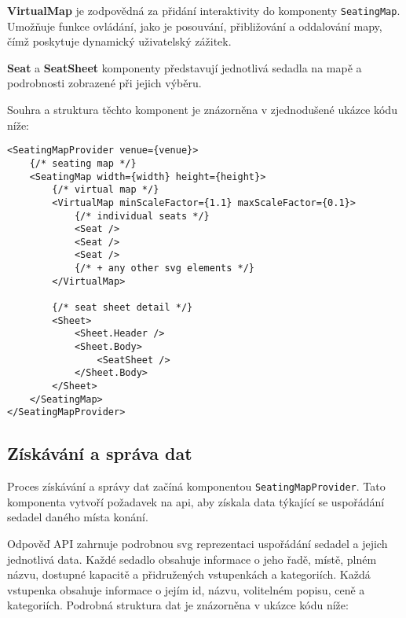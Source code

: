 \textbf{VirtualMap} je zodpovědná za přidání interaktivity do komponenty \texttt{SeatingMap}.
Umožňuje funkce ovládání, jako je posouvání, přibližování a oddalování mapy, čímž poskytuje dynamický uživatelský zážitek.

\textbf{Seat} a \textbf{SeatSheet} komponenty představují jednotlivá sedadla na mapě a podrobnosti zobrazené při jejich výběru.

Souhra a struktura těchto komponent je znázorněna v zjednodušené ukázce kódu níže:

\begin{verbatim}
<SeatingMapProvider venue={venue}>
	{/* seating map */}
	<SeatingMap width={width} height={height}>
		{/* virtual map */}
		<VirtualMap minScaleFactor={1.1} maxScaleFactor={0.1}>
			{/* individual seats */}
			<Seat />
			<Seat />
			<Seat />
			{/* + any other svg elements */}
		</VirtualMap>

		{/* seat sheet detail */}
		<Sheet>
			<Sheet.Header />
			<Sheet.Body>
				<SeatSheet />
			</Sheet.Body>
		</Sheet>
	</SeatingMap>
</SeatingMapProvider>
\end{verbatim}

\subsection{Získávání a správa dat}
\label{subsec:implementace-seating-data}
Proces získávání a správy dat začíná komponentou \texttt{SeatingMapProvider}.
Tato komponenta vytvoří požadavek na \ac{api}, aby získala data týkající se uspořádání sedadel daného místa konání.

Odpověď API zahrnuje podrobnou \ac{svg} reprezentaci uspořádání sedadel a jejich jednotlivá data.
Každé sedadlo obsahuje informace o jeho řadě, místě, plném názvu, dostupné kapacitě a přidružených vstupenkách a kategoriích.
Každá vstupenka obsahuje informace o jejím id, názvu, volitelném popisu, ceně a kategoriích.
Podrobná struktura dat je znázorněna v ukázce kódu níže:

